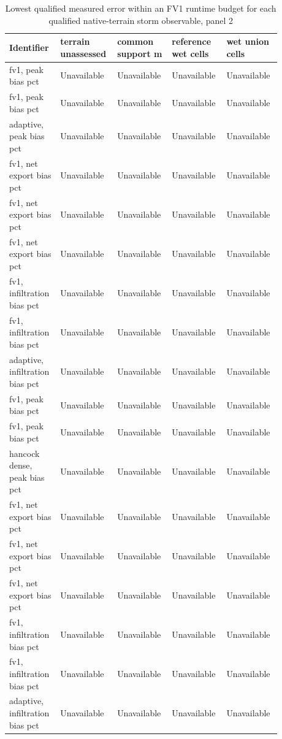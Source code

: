 \begin{longtable}{p{0.1760\linewidth}p{0.1760\linewidth}p{0.1760\linewidth}p{0.1760\linewidth}p{0.1760\linewidth}}
\caption{Lowest qualified measured error within an FV1 runtime budget for each qualified native-terrain storm observable, panel 2}\\
\hline
Identifier & terrain unassessed & common support m & reference wet cells & wet union cells \\
\hline\endhead
fv1, peak bias pct & Unavailable & Unavailable & Unavailable & Unavailable \\
fv1, peak bias pct & Unavailable & Unavailable & Unavailable & Unavailable \\
adaptive, peak bias pct & Unavailable & Unavailable & Unavailable & Unavailable \\
fv1, net export bias pct & Unavailable & Unavailable & Unavailable & Unavailable \\
fv1, net export bias pct & Unavailable & Unavailable & Unavailable & Unavailable \\
fv1, net export bias pct & Unavailable & Unavailable & Unavailable & Unavailable \\
fv1, infiltration bias pct & Unavailable & Unavailable & Unavailable & Unavailable \\
fv1, infiltration bias pct & Unavailable & Unavailable & Unavailable & Unavailable \\
adaptive, infiltration bias pct & Unavailable & Unavailable & Unavailable & Unavailable \\
fv1, peak bias pct & Unavailable & Unavailable & Unavailable & Unavailable \\
fv1, peak bias pct & Unavailable & Unavailable & Unavailable & Unavailable \\
hancock dense, peak bias pct & Unavailable & Unavailable & Unavailable & Unavailable \\
fv1, net export bias pct & Unavailable & Unavailable & Unavailable & Unavailable \\
fv1, net export bias pct & Unavailable & Unavailable & Unavailable & Unavailable \\
fv1, net export bias pct & Unavailable & Unavailable & Unavailable & Unavailable \\
fv1, infiltration bias pct & Unavailable & Unavailable & Unavailable & Unavailable \\
fv1, infiltration bias pct & Unavailable & Unavailable & Unavailable & Unavailable \\
adaptive, infiltration bias pct & Unavailable & Unavailable & Unavailable & Unavailable \\

\end{longtable}
